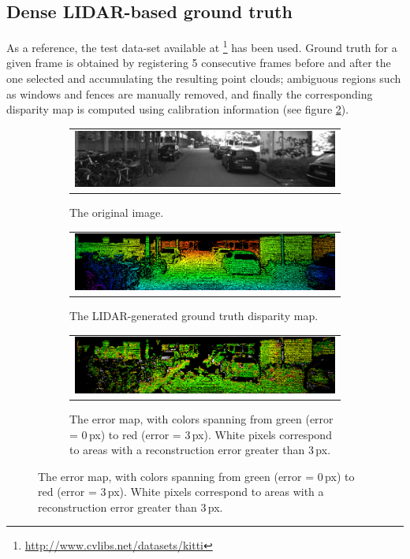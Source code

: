 \subsection{Dense \ac{LIDAR}-based ground truth}\label{ch:chapter03_01_01}

As a reference, the test data-set available at \footnote{\url{http://www.cvlibs.net/datasets/kitti}} has been used. Ground truth for a given frame is obtained by registering 5 consecutive frames before and after the one selected and accumulating the resulting point clouds; ambiguous regions such as windows and fences are manually removed, and finally the corresponding disparity map is computed using calibration information (see figure \ref{fig:cp03_lidarGT}).

\begin{figure}[h!]
        \centering
        \begin{subfigure}[b]{\textwidth}
	  \begin{tabular}{c}
	    \includegraphics[width=\textwidth]{lidarGTOriginal}
	  \end{tabular}
	  \caption{The original image.}\label{fig:cp03_lidarGTOriginal}
        \end{subfigure}%
        
        \begin{subfigure}[b]{\textwidth}
	  \begin{tabular}{c}
	    \includegraphics[width=\textwidth]{lidarGT}
	  \end{tabular}
	  \caption{The LIDAR-generated ground truth disparity map.}\label{fig:cp03_lidarGT}
        \end{subfigure}%
        
        \begin{subfigure}[b]{\textwidth}
	  \begin{tabular}{c}
	    \includegraphics[width=\textwidth]{lidarErrMap}
	  \end{tabular}
	  \caption{The error map, with colors spanning from green (error = 0\,px) to red (error = 3\,px). White pixels correspond to areas with a reconstruction error greater than 3\,px.}\label{fig:cp03_lidarErrMap}
        \end{subfigure}%
        

\end{figure}
